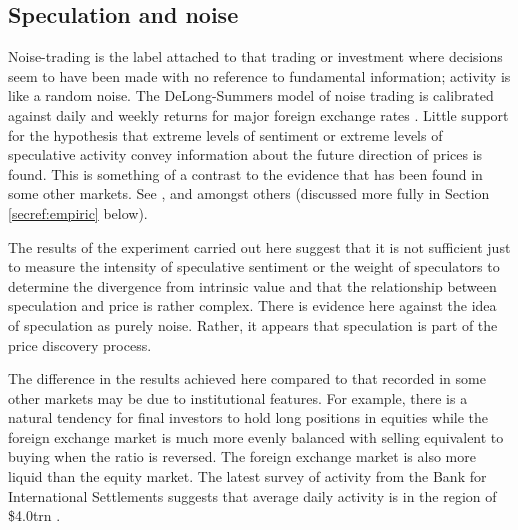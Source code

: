\documentclass[12pt, a4paper, oneside]{article} %
\begin{document}
\subsection{Speculation and noise}
Noise-trading is the label attached to that trading or investment where decisions seem to have been made with no reference to fundamental information; activity is like a random noise.    The DeLong-Summers model of noise trading is calibrated against daily and weekly returns for major foreign exchange rates \citep{Delong1990noise}.  Little support for the hypothesis that extreme levels of sentiment or extreme levels of speculative activity convey information about the future direction of prices is found.  This is something of a contrast to the evidence that has been found in some other markets.  See  \citep{DeBondtOver}, \citep{Chopra1992} and \citep{SteinOptions} amongst others (discussed more fully in Section \ref{secref:empiric} below).   

The results of the experiment carried out here suggest that it is not sufficient just to measure the intensity of speculative sentiment or the weight of speculators to determine the divergence from intrinsic value and that the relationship between speculation and price is rather complex.  There is evidence here against the idea of speculation as purely noise.  Rather, it appears that speculation is part of the price discovery process.

The difference in the results achieved here compared to that recorded in some other markets may be due to institutional features. For example, there is a natural tendency for final investors to hold long positions in equities while the foreign exchange market is much more evenly balanced with selling equivalent to buying when the ratio is reversed. The foreign exchange market is also more liquid than the equity market.  The latest survey of activity from the Bank for International Settlements suggests that average daily activity is in the region of \$4.0trn \citet{BISFX}. 
\end{document}
